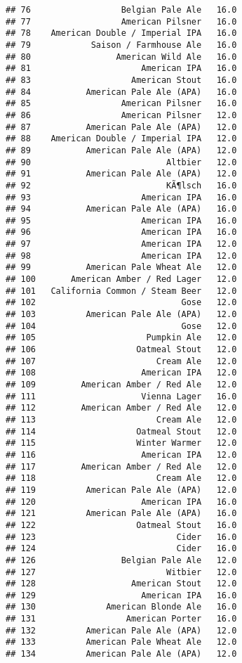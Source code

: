 \documentclass[
]{article}
\begin{document}
\begin{verbatim}
## 76                  Belgian Pale Ale   16.0
## 77                  American Pilsner   16.0
## 78    American Double / Imperial IPA   16.0
## 79            Saison / Farmhouse Ale   16.0
## 80                 American Wild Ale   16.0
## 81                      American IPA   16.0
## 83                    American Stout   16.0
## 84           American Pale Ale (APA)   16.0
## 85                  American Pilsner   16.0
## 86                  American Pilsner   12.0
## 87           American Pale Ale (APA)   12.0
## 88    American Double / Imperial IPA   12.0
## 89           American Pale Ale (APA)   12.0
## 90                           Altbier   12.0
## 91           American Pale Ale (APA)   12.0
## 92                           KÃ¶lsch   16.0
## 93                      American IPA   16.0
## 94           American Pale Ale (APA)   16.0
## 95                      American IPA   16.0
## 96                      American IPA   16.0
## 97                      American IPA   12.0
## 98                      American IPA   12.0
## 99           American Pale Wheat Ale   12.0
## 100       American Amber / Red Lager   12.0
## 101   California Common / Steam Beer   12.0
## 102                             Gose   12.0
## 103          American Pale Ale (APA)   12.0
## 104                             Gose   12.0
## 105                      Pumpkin Ale   12.0
## 106                    Oatmeal Stout   12.0
## 107                        Cream Ale   12.0
## 108                     American IPA   12.0
## 109         American Amber / Red Ale   12.0
## 111                     Vienna Lager   16.0
## 112         American Amber / Red Ale   12.0
## 113                        Cream Ale   12.0
## 114                    Oatmeal Stout   12.0
## 115                    Winter Warmer   12.0
## 116                     American IPA   12.0
## 117         American Amber / Red Ale   12.0
## 118                        Cream Ale   12.0
## 119          American Pale Ale (APA)   12.0
## 120                     American IPA   16.0
## 121          American Pale Ale (APA)   16.0
## 122                    Oatmeal Stout   16.0
## 123                            Cider   16.0
## 124                            Cider   16.0
## 126                 Belgian Pale Ale   12.0
## 127                          Witbier   12.0
## 128                   American Stout   12.0
## 129                     American IPA   16.0
## 130              American Blonde Ale   16.0
## 131                  American Porter   16.0
## 132          American Pale Ale (APA)   12.0
## 133          American Pale Wheat Ale   12.0
## 134          American Pale Ale (APA)   12.0

\end{verbatim}
\end{document}
